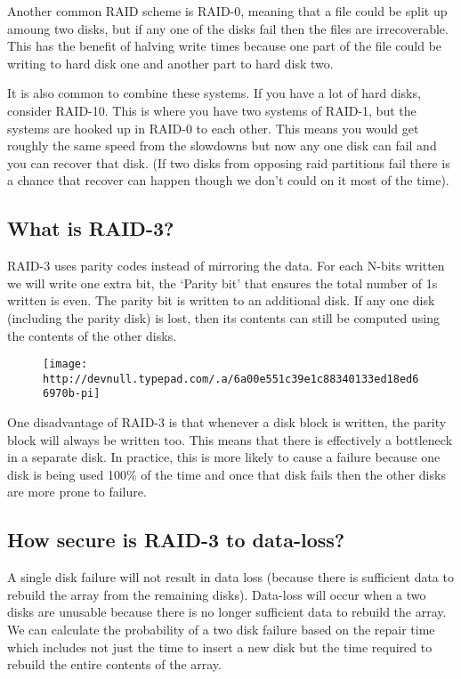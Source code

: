 Another common RAID scheme is RAID-0, meaning that a file could be split
up amoung two disks, but if any one of the disks fail then the files are
irrecoverable. This has the benefit of halving write times because one
part of the file could be writing to hard disk one and another part to
hard disk two.

It is also common to combine these systems. If you have a lot of hard
disks, consider RAID-10. This is where you have two systems of RAID-1,
but the systems are hooked up in RAID-0 to each other. This means you
would get roughly the same speed from the slowdowns but now any one disk
can fail and you can recover that disk. (If two disks from opposing raid
partitions fail there is a chance that recover can happen though we
don't could on it most of the time).

\subsection{What is RAID-3?}\label{what-is-raid-3}

RAID-3 uses parity codes instead of mirroring the data. For each N-bits
written we will write one extra bit, the `Parity bit' that ensures the
total number of 1s written is even. The parity bit is written to an
additional disk. If any one disk (including the parity disk) is lost,
then its contents can still be computed using the contents of the other
disks.

\begin{figure}[htbp]
\centering
\texttt{[image: http://devnull.typepad.com/.a/6a00e551c39e1c88340133ed18ed66970b-pi]}
\caption{}
\end{figure}

One disadvantage of RAID-3 is that whenever a disk block is written, the
parity block will always be written too. This means that there is
effectively a bottleneck in a separate disk. In practice, this is more
likely to cause a failure because one disk is being used 100\% of the
time and once that disk fails then the other disks are more prone to
failure.

\subsection{How secure is RAID-3 to
data-loss?}\label{how-secure-is-raid-3-to-data-loss}

A single disk failure will not result in data loss (because there is
sufficient data to rebuild the array from the remaining disks).
Data-loss will occur when a two disks are unusable because there is no
longer sufficient data to rebuild the array. We can calculate the
probability of a two disk failure based on the repair time which
includes not just the time to insert a new disk but the time required to
rebuild the entire contents of the array.

